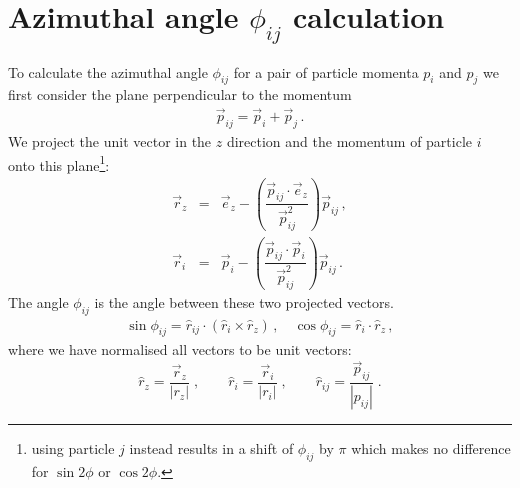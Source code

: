 \documentclass[main.tex]{subfiles}
\begin{document}
\section{Azimuthal angle $\phi_{ij}$ calculation}\label{appendix:fame1_phi}
To calculate the azimuthal angle $\phi_{ij}$ for a pair of particle momenta $p_i$ 
and $p_j$ we first consider the plane perpendicular to the momentum 
\begin{eqnarray}\label{eq:pij}
    \vec{p}_{ij} = \vec{p}_{i} + \vec{p}_{j} \, .
\end{eqnarray}
We project the unit vector in the $z$ direction and the momentum of particle $i$ onto 
this plane\footnote{using particle $j$ instead results in a shift of $\phi_{ij}$ by 
$\pi$ which makes no difference for $\sin2\phi$ or $\cos2\phi$.}: 
\begin{eqnarray}\label{eq:north_east}
    \vec{r}_{z} &=& \vec{e}_{z} - \left(\dfrac{\vec{p}_{ij} \cdot \vec{e}_{z}}{\vec{p}_{ij}^{2}}\right) \vec{p}_{ij} \, , \\
    \vec{r}_{i} &=& \vec{p}_{i} - \left(\dfrac{\vec{p}_{ij} \cdot \vec{p}_{i}}{\vec{p}_{ij}^{2}}\right) \vec{p}_{ij} \,.
\end{eqnarray}
The angle $\phi_{ij}$ is the angle between these two projected vectors.
\begin{eqnarray}\label{eq:sin_cos}
    \sin{\phi_{ij}} = 
    \hat r_{ij}\cdot\left( \hat{r}_{i} \times \hat{r}_{z} \right)\, , \quad \cos{\phi_{ij}} = \hat{r}_{i} \cdot \hat{r}_{z} \, ,
\end{eqnarray}
where we have normalised all vectors to be unit vectors:
\begin{equation}
\hat r_z = \frac{\vec{r}_z}{|r_z|}\;, \qquad \hat r_i = \frac{\vec{r}_i}{|r_i|}\;, \qquad \hat r_{ij} = \frac{\vec{p}_{ij}}{|p_{ij}|}\;.
\end{equation}
\end{document}
